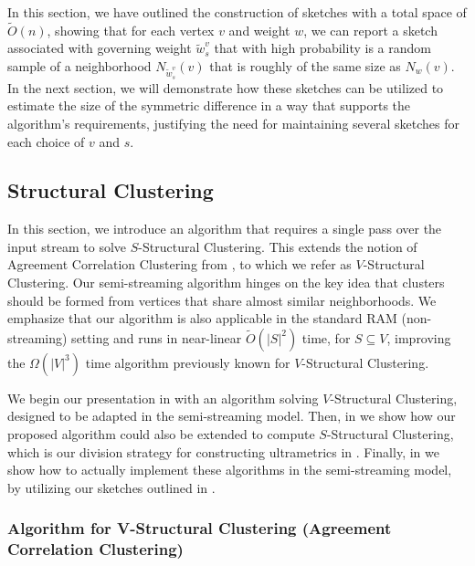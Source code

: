 \documentclass{article}
\begin{document}
In this section, we have outlined the construction of sketches with a total space of $\tilde{O}(n)$, showing that for each vertex $v$ and weight $w$, we can report a sketch associated with  governing weight \(\tilde{w}^v_s \) that with high probability is a random sample of a neighborhood $N_{\tilde{w}^v_s}(v)$ that is roughly of the same size as $N_w(v)$. 
In the next section, we will demonstrate how these sketches can be utilized to estimate the size of the symmetric difference in a way that supports the algorithm’s requirements, justifying the need for maintaining several sketches for each choice of $v$ and $s$. 


\subsection{Structural Clustering} \label{section:structuralClustering}
\newcommand{\agreez}[1]{A^3(#1)}

In this section, we introduce an algorithm that requires a single pass over the input stream to solve $S$-Structural Clustering. This extends the notion of Agreement Correlation Clustering from \cite{cohen2022fitting}, to which we refer as $V$-Structural Clustering. Our semi-streaming algorithm hinges on the key idea that clusters should be formed from vertices that share almost similar neighborhoods.
We emphasize that our algorithm is also applicable in the standard RAM (non-streaming) setting and runs in near-linear $\widetilde{O}(|S|^2)$ time, for $S\subseteq V$, improving the $\Omega(|V|^3)$ time algorithm previously known for $V$-Structural Clustering.

We begin our presentation in  with an algorithm solving $V$-Structural Clustering, designed to be adapted in the semi-streaming model.
Then, in  we show how our proposed algorithm could also be extended to compute $S$-Structural Clustering, which is our division strategy for constructing ultrametrics in .
Finally, in  we show how to actually implement these algorithms in the semi-streaming model, by utilizing our sketches outlined in .

\subsubsection{Algorithm for V-Structural Clustering (Agreement Correlation Clustering)}\label{section:structural_properties}
\end{document}
